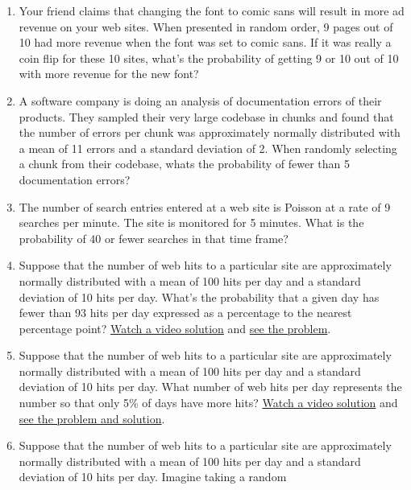 \documentclass[]{article}
\begin{document}
\begin{enumerate}
\def\labelenumi{\arabic{enumi}.}
\itemsep1pt\parskip0pt
\item
  Your friend claims that changing the font to comic sans will result in
  more ad revenue on your web sites. When presented in random order, 9
  pages out of 10 had more revenue when the font was set to comic sans.
  If it was really a coin flip for these 10 sites, what's the
  probability of getting 9 or 10 out of 10 with more revenue for the new
  font?
\item
  A software company is doing an analysis of documentation errors of
  their products. They sampled their very large codebase in chunks and
  found that the number of errors per chunk was approximately normally
  distributed with a mean of 11 errors and a standard deviation of 2.
  When randomly selecting a chunk from their codebase, whats the
  probability of fewer than 5 documentation errors?
\item
  The number of search entries entered at a web site is Poisson at a
  rate of 9 searches per minute. The site is monitored for 5 minutes.
  What is the probability of 40 or fewer searches in that time frame?
\item
  Suppose that the number of web hits to a particular site are
  approximately normally distributed with a mean of 100 hits per day and
  a standard deviation of 10 hits per day. What's the probability that a
  given day has fewer than 93 hits per day expressed as a percentage to
  the nearest percentage point?
  \href{https://www.youtube.com/watch?v=E-ancc7iTho\&index=10\&list=PLpl-gQkQivXhHOcVeU3bSJg78zaDYbP9L}{Watch
  a video solution} and
  \href{http://bcaffo.github.io/courses/06_StatisticalInference/homework/hw2.html\#4}{see
  the problem}.
\item
  Suppose that the number of web hits to a particular site are
  approximately normally distributed with a mean of 100 hits per day and
  a standard deviation of 10 hits per day. What number of web hits per
  day represents the number so that only 5\% of days have more hits?
  \href{https://www.youtube.com/watch?v=rv48_5C8gx4\&index=12\&list=PLpl-gQkQivXhHOcVeU3bSJg78zaDYbP9L}{Watch
  a video solution} and
  \href{http://bcaffo.github.io/courses/06_StatisticalInference/homework/hw2.html\#6}{see
  the problem and solution}.
\item
  Suppose that the number of web hits to a particular site are
  approximately normally distributed with a mean of 100 hits per day and
  a standard deviation of 10 hits per day. Imagine taking a random

\end{enumerate}
\end{document}
